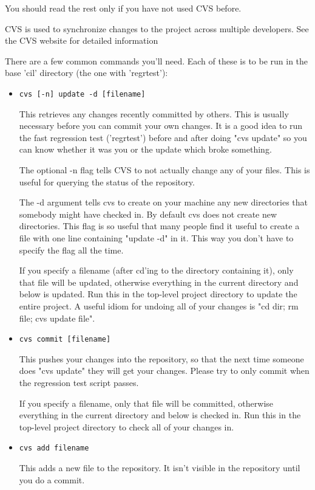\documentclass{article}
\def\t#1{{\tt #1}}
\begin{document}
 You should read the rest only if you have not used CVS before. 

 CVS is used to synchronize changes to the project across multiple
developers.  See the CVS website for detailed information

  
There are a few common commands you'll need.  Each of these is to be run
in the base 'cil' directory (the one with 'regrtest'):

\begin{itemize}
\item \t{cvs [-n] update -d [filename]}

    This retrieves any changes recently committed by others.  This is
    usually necessary before you can commit your own changes.  It is a
    good idea to run the fast regression test ('regrtest') before and
    after doing "cvs update" so you can know whether it was you or the
    update which broke something.

    The optional -n flag tells CVS to not actually change any of your
    files.  This is useful for querying the status of the repository.

    The -d argument tells cvs to create on your machine any new directories
    that somebody might have checked in. By default cvs does not create new
    directories. This flag is so useful that many people find it useful to
    create a  file with one line containing "update -d" in it.
    This way you don't have to specify the flag all the time.

    If you specify a filename (after cd'ing to the directory containing it),
    only that file will be updated, otherwise everything in the current
    directory and below is updated. Run this in the top-level project
    directory to update the entire project. A useful idiom for undoing all of
    your changes is "cd dir; rm file; cvs update file".

    
\item \t{cvs commit [filename]}

    This pushes your changes into the repository, so that the next time
    someone does "cvs update" they will get your changes.  Please try to
    only commit when the regression test script passes.
    
    If you specify a filename, only that file will be committed, otherwise
    everything in the current directory and below is checked in. Run this in
    the top-level project directory to check all of your changes in.

\item  \t{cvs add filename}

    This adds a new file to the repository.  It isn't visible in the
    repository until you do a commit.
\end{itemize}
 
\end{document}
